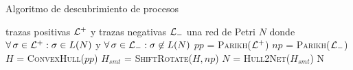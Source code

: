 \documentclass[spanish,pdf]{beamer}
\begin{document}
\begin{frame}[fragile]{Algoritmo de descubrimiento de procesos}{}
  \vspace*{-0.4cm}
    
  \begin{algorithm}[H]
  \scriptsize
    \caption*{Algoritmo completo de descubrimiento y simplificación supervisado}
    \begin{algorithmic}[1]
        \Require trazas positivas ${\mathcal L}^+$ y trazas negativas ${\mathcal L}_-$
        \Ensure una red de Petri $N$ donde $\forall \sigma \in \pmlog^+: \sigma \in L(N)$ y $\forall \sigma \in \pmlog_-: \sigma \not \in L(N)$
        \vspace{0.7pt}
        \State $pp$ = \textsc{Parikh}(${\mathcal L}^+$)
        \State $np$ = \textsc{Parikh}(${\mathcal L}_-$)
        \State $H$ = \textsc{ConvexHull}($pp$) \label{algo:lineqhull}
        \State $H_{smt}$ = \textsc{ShiftRotate}($H, np$)
        \State $N$ = \textsc{Hull2Net}($H_{smt}$)
        \State \Return N
        \EndProcedure
    \end{algorithmic}
    \label{algo}
  \end{algorithm}
\end{frame}
\end{document}
